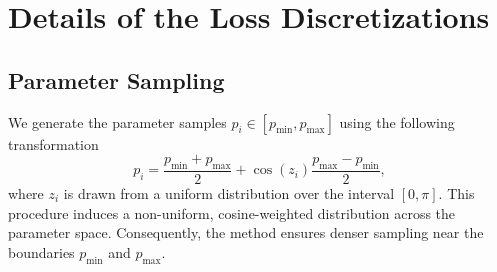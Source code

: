 \documentclass[oneside]{article}
\begin{document}
\section{Details of the Loss Discretizations }\label{Loss Discretization Details}



\subsection{Parameter Sampling}\label{Parameter Sampling Details}
We generate the parameter samples $p_i \in [p_{\min}, p_{\max}]$ using the following transformation
\begin{equation}
p_i = \frac{p_{\min} + p_{\max}}{2} + \cos(z_i) \frac{p_{\max} - p_{\min}}{2},
\end{equation}
where $z_i$ is drawn from a uniform distribution over the interval $[0, \pi]$. This procedure induces a non-uniform, cosine-weighted distribution across the parameter space. Consequently, the method ensures denser sampling near the boundaries $p_{\min}$ and $p_{\max}$.



\end{document}
